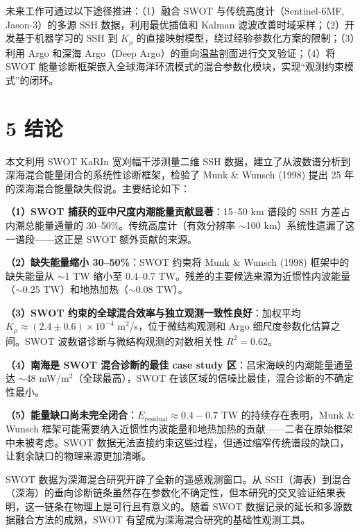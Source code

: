 \documentclass[11pt,a4paper]{article}
\begin{document}
未来工作可通过以下途径推进：（1）融合 SWOT 与传统高度计（Sentinel-6MF, Jason-3）的多源 SSH 数据，利用最优插值和 Kalman 滤波改善时域采样；（2）开发基于机器学习的 SSH 到 $K_\rho$ 的直接映射模型，绕过经验参数化方案的限制；（3）利用 Argo 和深海 Argo（Deep Argo）的垂向温盐剖面进行交叉验证；（4）将 SWOT 能量诊断框架嵌入全球海洋环流模式的混合参数化模块，实现``观测约束模式''的闭环。\par

\section*{5  结论}

本文利用 SWOT KaRIn 宽刈幅干涉测量二维 SSH 数据，建立了从波数谱分析到深海混合能量闭合的系统性诊断框架，检验了 Munk \& Wunsch (1998) 提出 25 年的深海混合能量缺失假说。主要结论如下：\par

\textbf{（1）SWOT 捕获的亚中尺度内潮能量贡献显著}：15--50 km 谱段的 SSH 方差占内潮总能量通量的 30--50\%。传统高度计（有效分辨率 $\sim$100 km）系统性遗漏了这一谱段——这正是 SWOT 额外贡献的来源。\par

\textbf{（2）缺失能量缩小 30--50\%}：SWOT 约束将 Munk \& Wunsch (1998) 框架中的缺失能量从 $\sim$1 TW 缩小至 0.4--0.7 TW。残差的主要候选来源为近惯性内波能量（$\sim$0.25 TW）和地热加热（$\sim$0.08 TW）。\par

\textbf{（3）SWOT 约束的全球混合效率与独立观测一致性良好}：加权平均 $K_\rho \approx (2.4 \pm 0.6) \times 10^{-4}$ m$^2$/s，位于微结构观测和 Argo 细尺度参数化估算之间。SWOT 波数谱诊断与微结构观测的对数相关性 $R^2 = 0.62$。\par

\textbf{（4）南海是 SWOT 混合诊断的最佳 case study 区}：吕宋海峡的内潮能量通量达 $\sim$48 mW/m$^2$（全球最高），SWOT 在该区域的信噪比最佳，混合诊断的不确定性最小。\par

\textbf{（5）能量缺口尚未完全闭合}：$E_{\text{residual}} \approx 0.4-0.7$ TW 的持续存在表明，Munk \& Wunsch 框架可能需要纳入近惯性内波能量和地热加热的贡献——二者在原始框架中未被考虑。SWOT 数据无法直接约束这些过程，但通过缩窄传统谱段的缺口，让剩余缺口的物理来源更加清晰。\par

SWOT 数据为深海混合研究开辟了全新的遥感观测窗口。从 SSH（海表）到混合（深海）的垂向诊断链条虽然存在参数化不确定性，但本研究的交叉验证结果表明，这一链条在物理上是可行且有意义的。随着 SWOT 数据记录的延长和多源数据融合方法的成熟，SWOT 有望成为深海混合研究的基础性观测工具。\par
\end{document}
